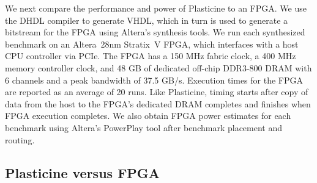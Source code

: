We next compare the performance and power of Plasticine to an FPGA.
We use the DHDL compiler to generate VHDL, which in turn is used to generate a bitstream for the FPGA using Altera's synthesis tools.
We run each synthesized benchmark on an Altera~28nm Stratix~V FPGA, which interfaces with a host CPU controller via PCIe.
The FPGA has a 150 MHz fabric clock, a 400 MHz memory controller clock, and 48 GB of dedicated off-chip DDR3-800 DRAM with 6 channels and a peak bandwidth of 37.5 GB/s.
Execution times for the FPGA are reported as an average of 20 runs. Like Plasticine, timing starts after copy of data from the host to the FPGA's dedicated DRAM completes and finishes when FPGA execution completes. We also obtain FPGA power estimates for each benchmark using Altera's PowerPlay tool after benchmark placement and routing.

\subsection{Plasticine versus FPGA}

